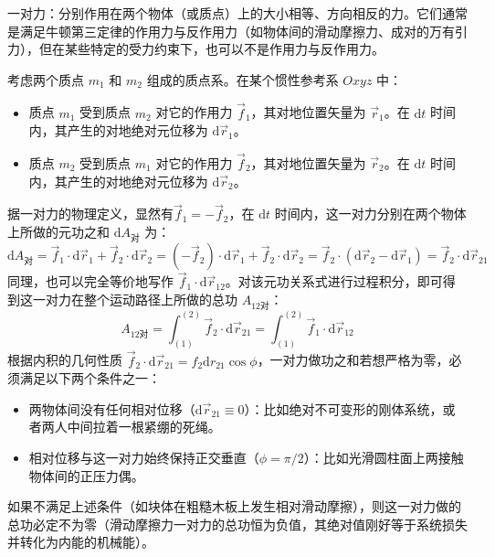 \documentclass[lang=cn,11pt]{elegantbook}
\begin{document}
\begin{definition}[一对力]
一对力：分别作用在两个物体（或质点）上的大小相等、方向相反的力。它们通常是满足牛顿第三定律的作用力与反作用力（如物体间的滑动摩擦力、成对的万有引力），但在某些特定的受力约束下，也可以不是作用力与反作用力。
\end{definition}
考虑两个质点 $m_1$ 和 $m_2$ 组成的质点系。在某个惯性参考系 $Oxyz$ 中：
\begin{itemize}
\item 质点 $m_1$ 受到质点 $m_2$ 对它的作用力 $\vec{f}_1$，其对地位置矢量为 $\vec{r}_1$。在 $\mathrm{d}t$ 时间内，其产生的对地绝对元位移为 $\mathrm{d}\vec{r}_1$。
\item 质点 $m_2$ 受到质点 $m_1$ 对它的作用力 $\vec{f}_2$，其对地位置矢量为 $\vec{r}_2$。在 $\mathrm{d}t$ 时间内，其产生的对地绝对元位移为 $\mathrm{d}\vec{r}_2$。
\end{itemize}
据一对力的物理定义，显然有$\vec{f}_1 = -\vec{f}_2$，在 $\mathrm{d}t$ 时间内，这一对力分别在两个物体上所做的元功之和 $\mathrm{d}A_{\text{对}}$ 为：
$$\mathrm{d}A_{\text{对}} = \vec{f}_1 \cdot \mathrm{d}\vec{r}_1 + \vec{f}_2 \cdot \mathrm{d}\vec{r}_2= (-\vec{f}_2) \cdot \mathrm{d}\vec{r}_1 + \vec{f}_2 \cdot \mathrm{d}\vec{r}_2 = \vec{f}_2 \cdot (\mathrm{d}\vec{r}_2 - \mathrm{d}\vec{r}_1)= \vec{f}_2 \cdot \mathrm{d}\vec{r}_{21}$$同理，也可以完全等价地写作 $\vec{f}_1 \cdot \mathrm{d}\vec{r}_{12}$。对该元功关系式进行过程积分，即可得到这一对力在整个运动路径上所做的总功 $A_{12\text{对}}$：
$$A_{12\text{对}} = \int_{(1)}^{(2)} \vec{f}_2 \cdot \mathrm{d}\vec{r}_{21} = \int_{(1)}^{(2)} \vec{f}_1 \cdot \mathrm{d}\vec{r}_{12}$$
根据内积的几何性质 $\vec{f}_2 \cdot \mathrm{d}\vec{r}_{21} = f_2 \mathrm{d}r_{21} \cos\phi$，一对力做功之和若想严格为零，必须满足以下两个条件之一：
\begin{itemize}
\item 两物体间没有任何相对位移（$\mathrm{d}\vec{r}_{21} \equiv 0$）：比如绝对不可变形的刚体系统，或者两人中间拉着一根紧绷的死绳。
\item 相对位移与这一对力始终保持正交垂直（$\phi = \pi/2$）：比如光滑圆柱面上两接触物体间的正压力偶。
\end{itemize}
如果不满足上述条件（如块体在粗糙木板上发生相对滑动摩擦），则这一对力做的总功必定不为零（滑动摩擦力一对力的总功恒为负值，其绝对值刚好等于系统损失并转化为内能的机械能）。
\end{document}
